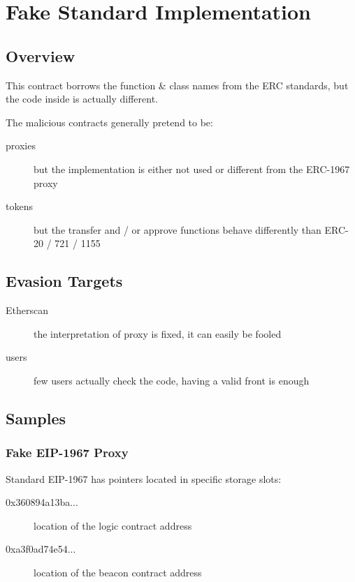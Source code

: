 \section{Fake Standard Implementation} \label{sec:fake-implementation}

\subsection{Overview}

This contract borrows the function \& class names from the ERC standards, but the code inside is actually different.

The malicious contracts generally pretend to be:

\begin{description}
\item[proxies]{but the implementation is either not used or different from the ERC-1967 proxy}
\item[tokens]{but the transfer and / or approve functions behave differently than ERC-20 / 721 / 1155}
\end{description}

\subsection{Evasion Targets}

\begin{description}
\item[Etherscan]{the interpretation of proxy is fixed, it can easily be fooled}
\item[users]{few users actually check the code, having a valid front is enough}
\end{description}

\subsection{Samples}

\subsubsection{Fake EIP-1967 Proxy}

Standard EIP-1967 \cite{eip-1967} has pointers located in specific storage slots:

\begin{description}
\item[0x360894a13ba...]{location of the logic contract address}
\item[0xa3f0ad74e54...]{location of the beacon contract address}
\end{description}


